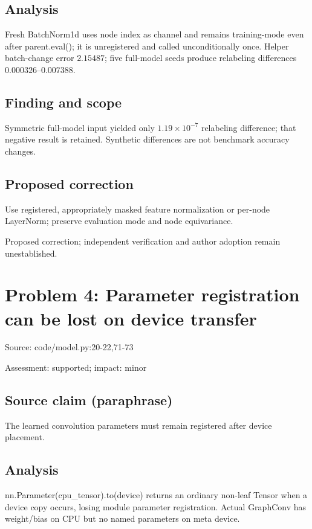 \documentclass[11pt]{article}
\begin{document}
\subsection*{Analysis}

Fresh BatchNorm1d uses node index as channel and remains training-mode even after parent.eval(); it is unregistered and called unconditionally once. Helper batch-change error \(2.15487\); five full-model seeds produce relabeling differences \(0.000326\)–\(0.007388\).

\subsection*{Finding and scope}

Symmetric full-model input yielded only \(1.19\times10^{-7}\) relabeling difference; that negative result is retained. Synthetic differences are not benchmark accuracy changes.

\subsection*{Proposed correction}

Use registered, appropriately masked feature normalization or per-node LayerNorm; preserve evaluation mode and node equivariance.

Proposed correction; independent verification and author adoption remain unestablished.

\section*{Problem 4: Parameter registration can be lost on device transfer}

Source: code/model.py:20-22,71-73

Assessment: supported; impact: minor

\subsection*{Source claim (paraphrase)}

The learned convolution parameters must remain registered after device placement.

\subsection*{Analysis}

nn.Parameter(cpu\_tensor).to(device) returns an ordinary non-leaf Tensor when a device copy occurs, losing module parameter registration. Actual GraphConv has weight/bias on CPU but no named parameters on meta device.
\end{document}
